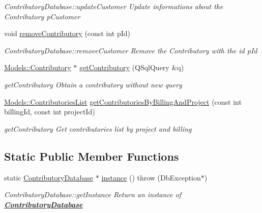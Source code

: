 \begin{DoxyCompactItemize}
\begin{DoxyCompactList}\small\item\em Contributory\+Database\+::update\+Customer Update informations about the Contributory {\itshape p\+Customer} \end{DoxyCompactList}\item 
void \hyperlink{classDatabases_1_1ContributoryDatabase_a3c99a1730bce8dbf3cab72896d8f17ff}{remove\+Contributory} (const int p\+Id)
\begin{DoxyCompactList}\small\item\em Contributory\+Database\+::remove\+Customer Remove the Contributory with the id {\itshape p\+Id} \end{DoxyCompactList}\item 
\hyperlink{classModels_1_1Contributory}{Models\+::\+Contributory} $\ast$ \hyperlink{classDatabases_1_1ContributoryDatabase_a6fc0f3eca03c49d919e7dbd2f8290555}{get\+Contributory} (Q\+Sql\+Query \&q)
\begin{DoxyCompactList}\small\item\em get\+Contributory Obtain a contributory without new query \end{DoxyCompactList}\item 
\hyperlink{classModels_1_1ContributoriesList}{Models\+::\+Contributories\+List} \hyperlink{classDatabases_1_1ContributoryDatabase_ab1da3fd9479fc39d05da9d52ffc9bea2}{get\+Contributories\+By\+Billing\+And\+Project} (const int billing\+Id, const int project\+Id)
\begin{DoxyCompactList}\small\item\em get\+Contributory Get contributories list by project and billing \end{DoxyCompactList}\end{DoxyCompactItemize}
\subsection*{Static Public Member Functions}
\begin{DoxyCompactItemize}
\item 
static \hyperlink{classDatabases_1_1ContributoryDatabase}{Contributory\+Database} $\ast$ \hyperlink{classDatabases_1_1ContributoryDatabase_ae0f4e8192dec79685b26e187d3871c4d}{instance} ()  throw (\+Db\+Exception$\ast$)
\begin{DoxyCompactList}\small\item\em Contributory\+Database\+::get\+Instance Return an instance of {\bfseries \hyperlink{classDatabases_1_1ContributoryDatabase}{Contributory\+Database}} \end{DoxyCompactList}\end{DoxyCompactItemize}
